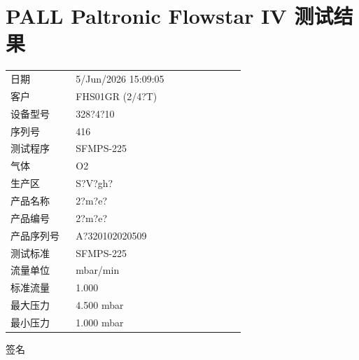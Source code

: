 \documentclass[UTF8,10pt,a4paper,fontset=fandol]{ctexart}
\newcommand{\fieldvalue}[1]{#1}
\newcommand{\handwritten}[1]{#1}
\begin{document}
\newpage

\section*{PALL Paltronic Flowstar IV 测试结果}

\begin{tabular}{@{}p{0.25\linewidth}p{0.65\linewidth}@{}}
日期 &
\fieldvalue{5/Jun/2026 15:09:05}
\\[2pt]
客户 &
\fieldvalue{FHS01GR (2/4?T)}
\\[2pt]
设备型号 &
\fieldvalue{328?4?10}
\\[2pt]
序列号 &
\fieldvalue{416}
\\[2pt]
测试程序 &
\fieldvalue{SFMPS-225}
\\[2pt]
气体 &
\fieldvalue{O2}
\\[2pt]
生产区 &
\fieldvalue{S?V?gh?}
\\[2pt]
产品名称 &
\fieldvalue{2?m?e?}
\\[2pt]
产品编号 &
\fieldvalue{2?m?e?}
\\[2pt]
产品序列号 &
\fieldvalue{A?320102020509}
\\[2pt]
测试标准 &
\fieldvalue{SFMPS-225}
\\[2pt]
流量单位 &
\fieldvalue{mbar/min}
\\[2pt]
标准流量 &
\fieldvalue{1.000}
\\[2pt]
最大压力 &
\fieldvalue{4.500 mbar}
\\[2pt]
最小压力 &
\fieldvalue{1.000 mbar}
\end{tabular}

\vspace{1em}

\fieldvalue{\handwritten{签名}}
\end{document}
